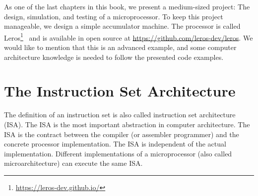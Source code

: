 \documentclass[%
    10pt,
    headinclude, footexclude,
    openright, %
    notitlepage,
    cleardoubleempty,
    headsepline,
    pointlessnumbers,
    bibtotoc, idxtotoc,
    ]{scrbook}
\newcommand{\myref}[2]{\href{#1}{#2}}
\renewcommand{\myref}[2]{{#2}{\footnote{\url{#1}}}}
\begin{document}

As one of the last chapters in this book, we present a medium-sized project:
The design, simulation, and testing of a microprocessor.
To keep this project manageable, we design a simple accumulator machine.
The processor is called \myref{https://leros-dev.github.io/}{Leros}~\cite{leros:arcs2019}
and is available in open source at \url{https://github.com/leros-dev/leros}.
We would like to mention that this is an advanced example, and some computer
architecture knowledge is needed to follow the presented code examples.

\section{The Instruction Set Architecture}

The definition of an instruction set is also called instruction set architecture (ISA).
The ISA is the most important abstraction in computer architecture.
The ISA is the contract between the compiler (or assembler programmer) and the
concrete processor implementation.
The ISA is independent of the actual implementation.
Different implementations of a microprocessor (also called microarchitecture)
can execute the same ISA.
\end{document}
